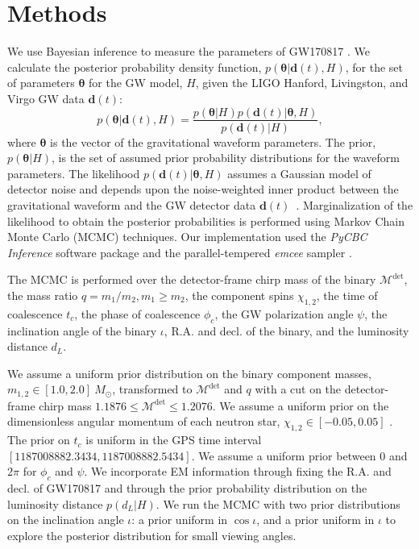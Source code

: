\section{Methods} \label{sec:methods}

We use Bayesian inference to measure the parameters of GW170817 \cite{Christensen:2001cr}. We calculate the posterior probability density function, $p(\bm{\theta}|\bm{d}(t),H)$, for the set of parameters $\bm{\theta}$ for the GW model, $H$, given the LIGO Hanford, Livingston, and Virgo GW data $\bm{d}(t)$:
\begin{equation}
p(\bm{\theta}|\bm{d}(t),H) = \frac{p(\bm{\theta}|H) p(\bm{d}(t)|\bm{\theta},H)}{p(\bm{d}(t)|H)}, 
\label{eq:rel_bin_postpdf}
\end{equation}
where $\bm{\theta}$ is the vector of the gravitational waveform parameters. The prior, $p(\bm{\theta}|H)$, is the set of assumed prior probability distributions for the waveform parameters. The likelihood $p(\bm{d}(t)|\bm{\theta},H)$ assumes a Gaussian model of detector noise and depends upon the noise-weighted inner product between the gravitational waveform and the GW detector data $\bm{d}(t)$~\cite{Finn:2000hj,Rover:2006bb}. Marginalization of the likelihood to obtain the posterior probabilities is performed using Markov Chain Monte Carlo (MCMC) techniques. Our implementation used the \textit{PyCBC Inference} software package \cite{pycbc-inference,pycbc-software} and the parallel-tempered \textit{emcee} sampler \cite{emcee}. 

The MCMC is performed over the detector-frame chirp mass of the binary $\mathcal{M}^\mathrm{det}$, the mass ratio $q = m_1/m_2, m_1 \ge m_2$, the component spins $\chi_{1,2}$, the time of coalescence $t_c$, the phase of coalescence $\phi_c$, the GW polarization angle $\psi$, the inclination angle of the binary $\iota$, R.A. and decl. of the binary, and the luminosity distance $d_L$. 

We assume a uniform prior distribution on the binary component masses, $m_{1,2}\in [1.0, 2.0]~M_{\odot}$, transformed to $\mathcal{M}^\mathrm{det}$ and $q$ with a cut on the detector-frame chirp mass $1.1876 \le \mathcal{M}^\mathrm{det} \le 1.2076$. We assume a uniform prior on the dimensionless angular momentum of each neutron star, $\chi_{1,2}\in [-0.05, 0.05]$ \cite{Brown:2012qf}. The prior on $t_c$ is uniform in the GPS time interval $[1187008882.3434,1187008882.5434]$. We assume a uniform prior between $0$ and $2\pi$ for $\phi_c$ and $\psi$. We incorporate EM information through fixing the R.A. and decl. of GW170817 and through the prior probability distribution on the luminosity distance $p(d_L|H)$. We run the MCMC with two prior distributions on the inclination angle $\iota$: a prior uniform in $\cos \iota$, and a prior uniform in $\iota$ to explore the posterior distribution for small viewing angles.

